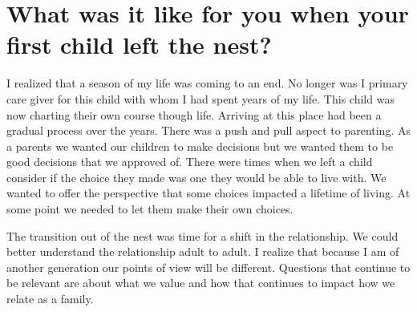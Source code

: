 \section{What was it like for you when your first child left the nest?}
I realized that a season of my life was coming to an end.
No longer was I primary care giver for this child with whom I had spent years of my life.
This child was now charting their own course though life.
Arriving at this place had been a gradual process over the years.
There was a push and pull aspect to parenting.
As a parents we wanted our children to make decisions but we wanted them to be good decisions that we approved of.
There were times when we left a child consider if the choice they made was one they would be able to live with.
We wanted to offer the perspective that some choices impacted a lifetime of living.
At some point we needed to let them make their own choices.

The transition out of the nest was time for a shift in the relationship.
We could better understand the relationship adult to adult.
I realize that because I am of another generation our points of view will be different.
Questions that continue to be relevant are about what we value and how that continues to impact how we relate as a family.






